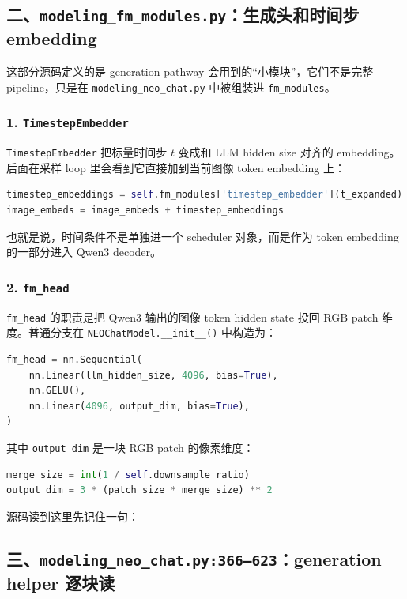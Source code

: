 \subsection{二、\texttt{modeling\_fm\_modules.py}：生成头和时间步 embedding}

这部分源码定义的是 generation pathway 会用到的“小模块”，它们不是完整 pipeline，只是在 \texttt{modeling\_neo\_chat.py} 中被组装进 \texttt{fm\_modules}。

\subsubsection{1. \texttt{TimestepEmbedder}}

\texttt{TimestepEmbedder} 把标量时间步 \(t\) 变成和 LLM hidden size 对齐的 embedding。后面在采样 loop 里会看到它直接加到当前图像 token embedding 上：

\begin{lstlisting}[language=Python]
timestep_embeddings = self.fm_modules['timestep_embedder'](t_expanded)
image_embeds = image_embeds + timestep_embeddings
\end{lstlisting}

也就是说，时间条件不是单独进一个 scheduler 对象，而是作为 token embedding 的一部分进入 Qwen3 decoder。

\subsubsection{2. \texttt{fm\_head}}

\texttt{fm\_head} 的职责是把 Qwen3 输出的图像 token hidden state 投回 RGB patch 维度。普通分支在 \texttt{NEOChatModel.\_\_init\_\_()} 中构造为：

\begin{lstlisting}[language=Python]
fm_head = nn.Sequential(
    nn.Linear(llm_hidden_size, 4096, bias=True),
    nn.GELU(),
    nn.Linear(4096, output_dim, bias=True),
)
\end{lstlisting}

其中 \texttt{output\_dim} 是一块 RGB patch 的像素维度：

\begin{lstlisting}[language=Python]
merge_size = int(1 / self.downsample_ratio)
output_dim = 3 * (patch_size * merge_size) ** 2
\end{lstlisting}

源码读到这里先记住一句：

\subsection{三、\texttt{modeling\_neo\_chat.py:366--623}：generation helper 逐块读}

